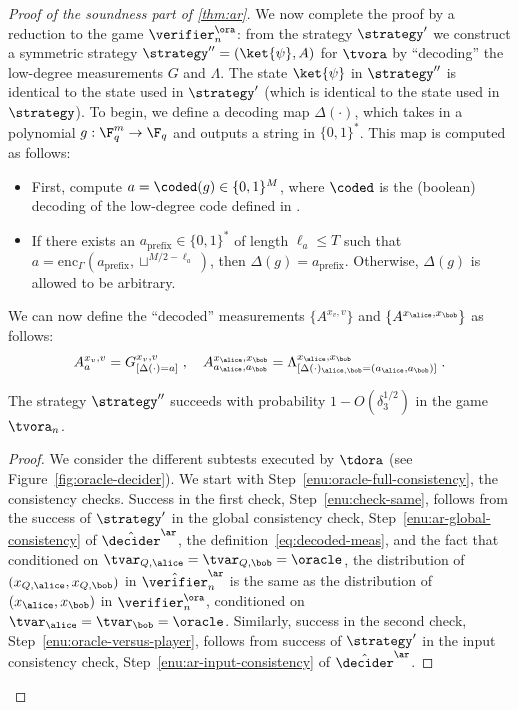\begin{proof}[Proof of the soundness part of \cref{thm:ar}]
We now complete the proof by a reduction to the game $\verifier_n^\ora$: from
the strategy $\strategy'$ we construct a symmetric strategy $\strategy'' =
(\ket{\psi}, A)$ for $\tvora$ by ``decoding'' the low-degree
measurements $G$ and $\Lambda$.
The state $\ket{\psi}$ in $\strategy''$ is identical to the state used in
$\strategy'$ (which is identical to the state used in $\strategy$).
To begin, we define a decoding map $\Delta(\cdot)$, which takes in a polynomial
$g:\F_q^m \to \F_q$ and outputs a string in $\{0,1\}^*$.
This map is computed as follows:
\begin{itemize}
\item First, compute $a = \coded(g) \in \{0,1\}^M$, where $\coded$ is the
  (boolean) decoding of the low-degree code defined in .
\item If there exists an $a_{\mathrm{prefix}} \in \{0, 1\}^*$ of length $\ell_a \leq T$
  such that $a = \mathrm{enc}_\Gamma(a_{\mathrm{prefix}}, \sqcup^{M/2 - \ell_a})$,
  then $\Delta(g) = a_{\mathrm{prefix}}$.
  Otherwise, $\Delta(g)$ is allowed to be arbitrary.
\end{itemize}
We can now define the ``decoded'' measurements $\{A^{{x}_v,v}\}$ and
$\{{A}^{{x}_\alice,{x}_\bob}\}$ as follows:
\begin{equation}
  \label{eq:decoded-meas}
  A^{{x}_v,v}_a  = G^{{x}_v, v}_{[\Delta(\cdot)=a]} \;,\quad
  A^{{x}_\alice,{x}_\bob}_{a_\alice, a_\bob}  =
  \Lambda^{{x}_\alice,{x}_\bob}_{[\Delta(\cdot)_{\alice,\bob}=(a_\alice,a_\bob)]}\;.
\end{equation}
  


\begin{lemma}\label{lem:ar-ora}
  The strategy $\strategy''$ succeeds with probability $1-O(\delta_3^{1/2})$ in the
  game $\tvora_n$.
\end{lemma}
	
\begin{proof}
  We consider the different subtests executed by $\tdora$ (see
  Figure~\ref{fig:oracle-decider}).
  We start with Step~\ref{enu:oracle-full-consistency}, the consistency checks.
  Success in the first check, Step~\ref{enu:check-same}, follows from the success of
  $\strategy'$ in the global consistency check,
  Step~\ref{enu:ar-global-consistency} of $\tdans$, the
  definition~\eqref{eq:decoded-meas}, and the fact that conditioned on
  $\tvar_{Q,\alice}=\tvar_{Q,\bob}=\oracle$, the distribution of
  $(x_{Q,\alice},x_{Q,\bob})$ in $\tvans_n$ is the same as the
  distribution of $(x_{\alice},x_{\bob})$ in $\verifier_n^\ora$, conditioned on
  $\tvar_\alice = \tvar_\bob = \oracle$.
  Similarly, success in the second check, Step~\ref{enu:oracle-versus-player},
  follows from success of $\strategy'$ in the input consistency check,
  Step~\ref{enu:ar-input-consistency} of $\tdans$.


\end{proof}
\end{proof}
